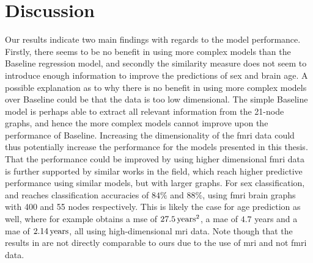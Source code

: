 \chapter{Discussion}
\label{chap:discussion}
    
Our results indicate two main findings with regards to the model performance. Firstly, there seems to be no benefit in using more complex models than the Baseline regression model, and secondly the similarity measure does not seem to introduce enough information to improve the predictions of sex and brain age. A possible explanation as to why there is no benefit in using more complex models over Baseline could be that the data is too low dimensional. The simple Baseline model is perhaps able to extract all relevant information from the 21-node graphs, and hence the more complex models cannot improve upon the performance of Baseline. Increasing the dimensionality of the \acrshort{fmri} data could thus potentially increase the performance for the models presented in this thesis. That the performance could be improved by using higher dimensional \acrshort{fmri} data is further supported by similar works in the field, which reach higher predictive performance using similar models, but with larger graphs. For sex classification, \cite{arslan} and \cite{understanding_gnn} reaches classification accuracies of $84\%$ and $88\%$, using \acrshort{fmri} brain graphs with 400 and 55 nodes respectively. This is likely the case for age prediction as well, where for example \cite{stankeviciute} obtains a \acrshort{mse} of $27.5\rm\,years^2$, \cite{amoroso_multiplex_age} a \acrshort{mae} of $4.7$ years and \cite{995_peng} a \acrshort{mae} of $2.14\rm\,years$, all using high-dimensional \acrshort{mri} data. Note though that the results in \cite{stankeviciute, amoroso_multiplex_age, 995_peng} are not directly comparable to ours due to the use of \acrshort{mri} and not \acrshort{fmri} data.

